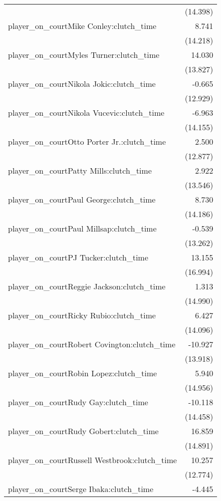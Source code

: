 \documentclass[
  landscape]{article}
\begin{document}
\begin{table}[!htbp]
\begin{tabular}{@{\extracolsep{5pt}}lD{.}{.}{-3} }
  & (14.398) \\ 
  player\_on\_courtMike Conley:clutch\_time & 8.741 \\ 
  & (14.218) \\ 
  player\_on\_courtMyles Turner:clutch\_time & 14.030 \\ 
  & (13.827) \\ 
  player\_on\_courtNikola Jokic:clutch\_time & -0.665 \\ 
  & (12.929) \\ 
  player\_on\_courtNikola Vucevic:clutch\_time & -6.963 \\ 
  & (14.155) \\ 
  player\_on\_courtOtto Porter Jr.:clutch\_time & 2.500 \\ 
  & (12.877) \\ 
  player\_on\_courtPatty Mills:clutch\_time & 2.922 \\ 
  & (13.546) \\ 
  player\_on\_courtPaul George:clutch\_time & 8.730 \\ 
  & (14.186) \\ 
  player\_on\_courtPaul Millsap:clutch\_time & -0.539 \\ 
  & (13.262) \\ 
  player\_on\_courtPJ Tucker:clutch\_time & 13.155 \\ 
  & (16.994) \\ 
  player\_on\_courtReggie Jackson:clutch\_time & 1.313 \\ 
  & (14.990) \\ 
  player\_on\_courtRicky Rubio:clutch\_time & 6.427 \\ 
  & (14.096) \\ 
  player\_on\_courtRobert Covington:clutch\_time & -10.927 \\ 
  & (13.918) \\ 
  player\_on\_courtRobin Lopez:clutch\_time & 5.940 \\ 
  & (14.956) \\ 
  player\_on\_courtRudy Gay:clutch\_time & -10.118 \\ 
  & (14.458) \\ 
  player\_on\_courtRudy Gobert:clutch\_time & 16.859 \\ 
  & (14.891) \\ 
  player\_on\_courtRussell Westbrook:clutch\_time & 10.257 \\ 
  & (12.774) \\ 
  player\_on\_courtSerge Ibaka:clutch\_time & -4.445 \\ 

\end{tabular}
\end{table}
\end{document}
